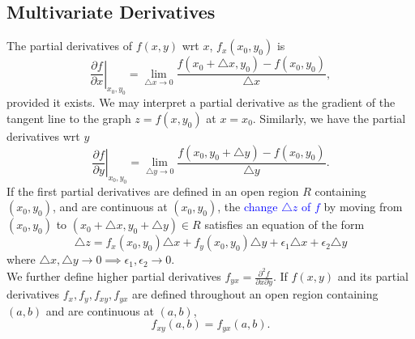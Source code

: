 \subsection{Multivariate Derivatives}
The \textcolor{Bittersweet}{partial derivatives} of $f(x,y)$ wrt $x$,
$f_x\left(  x_0,y_0 \right)$ is
\[\left.\frac{\partial f}{\partial x} \right|_{x_0,y_0}=\lim_{\triangle x \to
  0} \frac{f\left( x_0+\triangle x,y_0 \right) -f\left( x_0,y_0 \right)
}{\triangle x},\] provided it exists.  We may interpret a partial derivative as
the gradient of the tangent line to the graph $z=f(x,y_0)$ at $x=x_0$.
Similarly, we have the partial derivatives wrt $y$
\[\left.\frac{\partial f}{\partial y} \right|_{x_0,y_0}=\lim_{\triangle y \to
  0} \frac{f\left( x_0,y_0 +\triangle y \right) -f\left( x_0,y_0 \right)
}{\triangle y}.\]
If the first partial derivatives are defined in an open region $R$ containing
$\left( x_0,y_0 \right) $, and are continuous at $\left( x_0,y_0 \right) $, the
\textcolor{Blue}{change $\triangle z$ of $f$} by moving from $\left(
x_0,y_0 \right) $ to $\left( x_0+\triangle x,y_0+\triangle y \right) \in R$
satisfies an equation of the form
\[\triangle z=f_x\left( x_0,y_0 \right) \triangle x+f_y\left( x_0,y_0 \right)
\triangle y+\epsilon_1\triangle x+\epsilon_2\triangle y\]
where $\triangle x,\triangle y\to 0 \implies\epsilon_1,\epsilon_2\to 0$.\\
We further define \textcolor{Bittersweet}{higher partial derivatives}
$f_{yx}=\frac{\partial^{2} f}{\partial x\partial y} $.
If $f\left( x,y \right) $ and its partial derivatives $f_x, f_y,f_{xy},f_{yx}$
are defined throughout an open region containing $\left( a,b \right) $ and are
continuous at $\left( a,b \right) $,
\[f_{xy}\left( a,b \right) =f_{yx}\left( a,b \right).\] 

